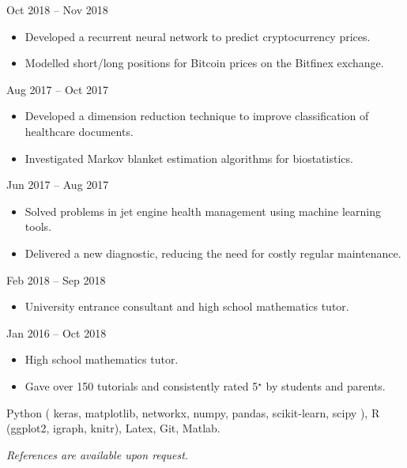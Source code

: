 \documentclass[
  date,
  number,
]{wgu-cv}
\begin{document}
{}
{Oct 2018 -- Nov 2018}

\begin{itemize}
	\item Developed a recurrent neural network to predict cryptocurrency prices.
	\item Modelled short/long positions for Bitcoin prices on the Bitfinex exchange.
\end{itemize}


{}
{Aug 2017 -- Oct 2017}

\begin{itemize}
	\item Developed a dimension reduction technique to
    improve classification of healthcare documents.
	\item Investigated Markov blanket estimation algorithms for biostatistics.
\end{itemize}


{}
{Jun 2017 -- Aug 2017}

\begin{itemize}
	\item Solved problems in jet engine health management using machine learning tools.
	\item Delivered a new diagnostic, reducing the need for costly regular maintenance.
\end{itemize}



{}
{Feb 2018 -- Sep 2018}

\begin{itemize}
	\item University entrance consultant and high school mathematics tutor.
\end{itemize}


{}
{Jan 2016 -- Oct 2018}

\begin{itemize}
	\item High school mathematics tutor.
	\item Gave over 150 tutorials and consistently rated 5$^\star$ by students and parents.
\end{itemize}



Python (%
  keras,
  matplotlib,
  networkx,
  numpy,
  pandas,
  scikit-learn,
  scipy%
),
R (ggplot2, igraph, knitr),
Latex,
Git,
Matlab.



\emph{References are available upon request.}



\nobibliography*
\end{document}
